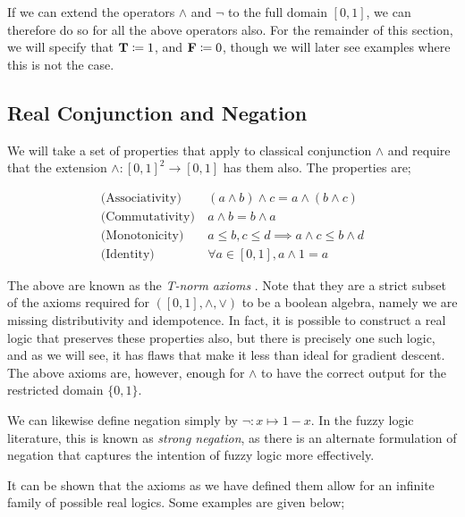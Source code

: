 If we can extend the operators $\land$ and $\neg$ to the full domain $[0,1]$, we can therefore do so for all the above operators also. For the remainder of this section, we will specify that $\textbf{T} \coloneqq 1$, and $\textbf{F} \coloneqq 0$, though we will later see examples where this is not the case.

\subsection{Real Conjunction and Negation}

We will take a set of properties that apply to classical conjunction $\land$ and require that the extension $\land : [0,1]^2 \to [0,1]$ has them also. The properties are;

$$
\begin{aligned}
\text{(Associativity)}&\ (a \land b) \land c = a \land (b \land c) \\
\text{(Commutativity)}&\ a \land b = b \land a \\
\text{(Monotonicity)}&\ a \leq b, c \leq d \implies a \land c \leq b \land d \\
\text{(Identity)}&\ \forall a \in [0,1], a \land 1 = a
\end{aligned}
$$

The above are known as the \textit{T-norm axioms} \cite{tnorms}. Note that they are a strict subset of the axioms required for $([0,1], \land, \lor)$ to be a boolean algebra, namely we are missing distributivity and idempotence. In fact, it is possible to construct a real logic that preserves these properties also, but there is precisely one such logic, and as we will see, it has flaws that make it less than ideal for gradient descent. The above axioms are, however, enough for $\land$ to have the correct output for the restricted domain $\{0,1\}$. 

We can likewise define negation simply by $\lnot : x \mapsto 1 - x$. In the fuzzy logic literature, this is known as \textit{strong negation}, as there is an alternate formulation of negation that captures the intention of fuzzy logic more effectively.

It can be shown that the axioms as we have defined them allow for an infinite family of possible real logics. Some examples are given below;

